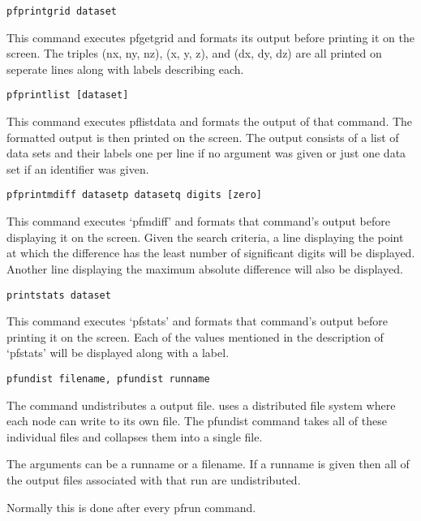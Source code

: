 \begin{description}
        
\item{\begin{verbatim}pfprintgrid dataset\end{verbatim}}
This command executes pfgetgrid and formats its output before printing
it on the screen.  The triples (nx, ny, nz), (x, y, z), and
(dx, dy, dz) are all printed on seperate lines along with labels
describing each.
        
        
\item{\begin{verbatim}pfprintlist [dataset]\end{verbatim}}
This command executes pflistdata and formats the output of that
command.  The formatted output is then printed on the screen.  The
output consists of a list of data sets and their labels one per line
if no argument was given or just one data set if an identifier was
given.
        
        
\item{\begin{verbatim}pfprintmdiff datasetp datasetq digits [zero]\end{verbatim}}
This command executes `pfmdiff' and formats that command's output
before displaying it on the screen.  Given the search criteria, a line
displaying the point at which the difference has the least number of
significant digits will be displayed.  Another line displaying the
maximum absolute difference will also be displayed.
 
        
\item{\begin{verbatim}printstats dataset\end{verbatim}}
This command executes `pfstats' and formats that command's output
before printing it on the screen.  Each of the values mentioned in the
description of `pfstats' will be displayed along with a label.


\item{\begin{verbatim}pfundist filename, pfundist runname\end{verbatim}}

The command undistributes a \parflow{} output file.  \parflow{} uses a
distributed file system where each node can write to its own file.
The pfundist command takes all of these individual files and collapses
them into a single file.

The arguments can be a runname or a filename.  If a runname is given
then all of the output files associated with that run are
undistributed.

Normally this is done after every pfrun command.
        
\end{description}        

